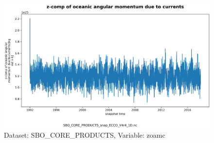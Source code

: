 \begin{figure}[H]
\centering
\includegraphics[scale=0.55]{../images/plots/v4r4/oneD_plots/SBO_Core_Products/zoamc.png}
\caption{Dataset: SBO\_CORE\_PRODUCTS, Variable: zoamc}
\label{tab:table-SBO_CORE_PRODUCTS_zoamc-Plot}
\end{figure}
\newpage
\pagebreak
